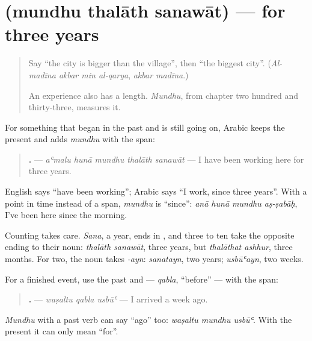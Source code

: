 \section[\texorpdfstring{\ar{منذ} \ar{ثلاث} \ar{سنوات} (mundhu thalāth sanawāt)}{منذ ثلاث سنوات (mundhu thalāth sanawāt)}]{   (mundhu thalāth sanawāt) — for three years}

\label{lesson:AR-C290-mundhu}



\begin{quote}
Say \textquotedblleft{}the city is bigger than the village\textquotedblright{}, then \textquotedblleft{}the biggest city\textquotedblright{}. (\emph{Al-madīna akbar min al-qarya}, \emph{akbar madīna}.)

An experience also has a length. \emph{Mundhu}, from chapter two hundred and thirty-three, measures it.
\end{quote}

\begin{grammarlens}[title={Grammar Lens: mundhu and the present}]
For something that began in the past and is still going on, Arabic keeps the present and adds \emph{mundhu} with the span:

\begin{quote}
\textbf{    .} — \emph{aʿmalu hunā mundhu thalāth sanawāt} — I have been working here for three years.
\end{quote}

English says \textquotedblleft{}have been working\textquotedblright{}; Arabic says \textquotedblleft{}I work, since three years\textquotedblright{}. With a point in time instead of a span, \emph{mundhu} is \textquotedblleft{}since\textquotedblright{}: \emph{anā hunā mundhu aṣ-ṣabāḥ}, I've been here since the morning.

Counting takes care. \emph{Sana}, a year, ends in \textbf{}, and three to ten take the opposite ending to their noun: \emph{thalāth sanawāt}, three years, but \emph{thalāthat ashhur}, three months. For two, the noun takes \emph{-ayn}: \emph{sanatayn}, two years; \emph{usbūʿayn}, two weeks.
\end{grammarlens}

\begin{grammarlens}[title={Grammar Lens: ago}]
For a finished event, use the past and \textbf{} — \emph{qabla}, \textquotedblleft{}before\textquotedblright{} — with the span:

\begin{quote}
\textbf{  .} — \emph{waṣaltu qabla usbūʿ} — I arrived a week ago.
\end{quote}

\emph{Mundhu} with a past verb can say \textquotedblleft{}ago\textquotedblright{} too: \emph{waṣaltu mundhu usbūʿ}. With the present it can only mean \textquotedblleft{}for\textquotedblright{}.
\end{grammarlens}

